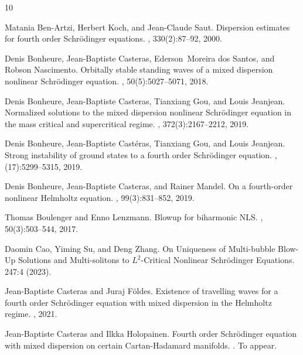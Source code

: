 \documentclass[a4paper,two-side,10pt]{amsart}
\numberwithin{equation}{section}
\begin{document}
%
%

\begin{thebibliography}{10}

Matania Ben-Artzi, Herbert Koch, and Jean-Claude Saut.
\newblock Dispersion estimates for fourth order {S}chr\"{o}dinger equations.
, 330(2):87--92, 2000.

Denis Bonheure, Jean-Baptiste Casteras, Ederson~Moreira dos Santos, and Robson
  Nascimento.
\newblock Orbitally stable standing waves of a mixed dispersion nonlinear
  {S}chr\"{o}dinger equation.
, 50(5):5027--5071, 2018.

Denis Bonheure, Jean-Baptiste Casteras, Tianxiang Gou, and Louis Jeanjean.
\newblock Normalized solutions to the mixed dispersion nonlinear
  {S}chr\"{o}dinger equation in the mass critical and supercritical regime.
, 372(3):2167--2212, 2019.

Denis Bonheure, Jean-Baptiste Cast\'{e}ras, Tianxiang Gou, and Louis Jeanjean.
\newblock Strong instability of ground states to a fourth order
  {S}chr\"{o}dinger equation.
, (17):5299--5315, 2019.

Denis Bonheure, Jean-Baptiste Casteras, and Rainer Mandel.
\newblock On a fourth-order nonlinear {H}elmholtz equation.
, 99(3):831--852, 2019.

Thomas Boulenger and Enno Lenzmann.
\newblock Blowup for biharmonic {NLS}.
, 50(3):503--544, 2017.

Daomin Cao, Yiming Su, and Deng Zhang.
\newblock On Uniqueness of Multi-bubble Blow-Up Solutions and Multi-solitons to $L^2$-Critical Nonlinear Schr\" odinger Equations.
 247:4 (2023).

Jean-Baptiste Casteras and Juraj F\"{o}ldes.
\newblock Existence of travelling waves for a fourth order {S}chr\"{o}dinger
  equation with mixed dispersion in the {H}elmholtz regime.
, 2021.

Jean-Baptiste Casteras and Ilkka Holopainen.
\newblock Fourth order {S}chr\"{o}dinger equation with mixed dispersion on
  certain {C}artan-{H}adamard manifolds.
.
\newblock To appear.


\end{thebibliography}
\end{document}
